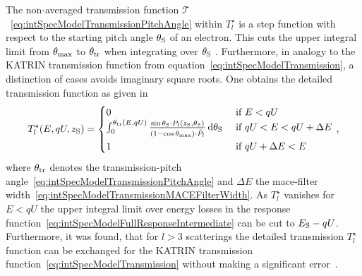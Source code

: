 The non-averaged transmission function $\mathcal{T}$~\eqref{eq:intSpecModelTransmissionPitchAngle} within $T_l^{\star}$ is a step function with respect to the starting pitch angle $\theta_\mathrm{S}$ of an electron. This cuts the upper integral limit from $\theta_\mathrm{max}$ to $\theta_\mathrm{tr}$ when integrating over $\theta_\mathrm{S}$ . Furthermore, in analogy to the KATRIN transmission function from equation~\ref{eq:intSpecModelTransmission}, a distinction of cases avoids imaginary square roots. One obtains the detailed transmission function as given in~\cite{Groh2015,Kleesiek2019}
\begin{equation}
	\label{eq:intSpecModelDetailedTransmission}
	T_l^{\star}(E,qU,z_\mathrm{S}) =
	\begin{cases}
		0 &\text{ if } E < qU \\
		\int_{0}^{\theta_\mathrm{tr}(E,qU)}
		\frac{
			\sin\theta_\mathrm{S} \cdot
			P_l(z_\mathrm{S}, \theta_\mathrm{S})
		}{
			(1-\cos\theta_\mathrm{max}) \cdot \bar{P}_l \vphantom{\sum_i^i}
		} 
		\mathop{}\!\mathrm{d} \theta_\mathrm{S}
		&\text{ if } qU < E < qU + \Delta E \\
		1 &\text{ if } qU+\Delta E < E
	\end{cases}
	\text{\,,}
\end{equation}
where $\theta_\mathrm{tr}$ denotes the transmission-pitch angle~\eqref{eq:intSpecModelTransmissionPitchAngle} and $\Delta E$ the \gls{mace}-filter width~\eqref{eq:intSpecModelTransmissionMACEFilterWidth}. As $T_l^{\star}$ vanishes for $E<qU$ the upper integral limit over energy losses in the response function~\ref{eq:intSpecModelFullResponseIntermediate} can be cut to $E_\mathrm{S}-qU$. Furthermore, it was found, that for $l>3$ scatterings the detailed transmission $T_l^{\star}$ function can be exchanged for the KATRIN transmission function~\eqref{eq:intSpecModelTransmission} without making a significant error~\cite{Groh2015}.

